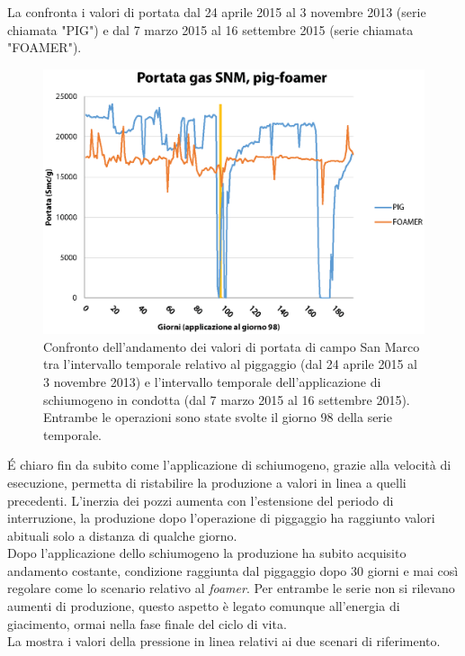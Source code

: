 La  confronta i valori di portata dal 24 aprile 2015 al 3 novembre 2013 (serie chiamata "PIG") e dal 7 marzo 2015 al 16 settembre 2015 (serie chiamata "FOAMER").
\begin{figure}[htbp]
    \centering
    \includegraphics[width=\textwidth]{fig/test/graphs/pig-foamer-portata.eps}
    \caption{Confronto dell'andamento dei valori di portata di campo San Marco tra l'intervallo temporale relativo al piggaggio (dal 24 aprile 2015 al 3 novembre 2013) e l'intervallo temporale dell'applicazione di schiumogeno in condotta (dal 7 marzo 2015 al 16 settembre 2015). Entrambe le operazioni sono state svolte il giorno 98 della serie temporale.} 
    \label{fig:pig-foamer-portata}
\end{figure}
\'E chiaro fin da subito come l'applicazione di schiumogeno, grazie alla velocità di esecuzione, permetta di ristabilire la produzione a valori in linea a quelli precedenti. L'inerzia dei pozzi aumenta con l'estensione del periodo di interruzione, la produzione dopo l'operazione di piggaggio ha raggiunto valori abituali solo a distanza di qualche giorno.\\
Dopo l'applicazione dello schiumogeno la produzione ha subito acquisito andamento costante, condizione raggiunta dal piggaggio dopo 30 giorni e mai così regolare come lo scenario relativo al \textit{foamer}. Per entrambe le serie non si rilevano aumenti di produzione, questo aspetto è legato comunque all'energia di giacimento, ormai nella fase finale del ciclo di vita.\\
La  mostra i valori della pressione in linea relativi ai due scenari di riferimento. 
